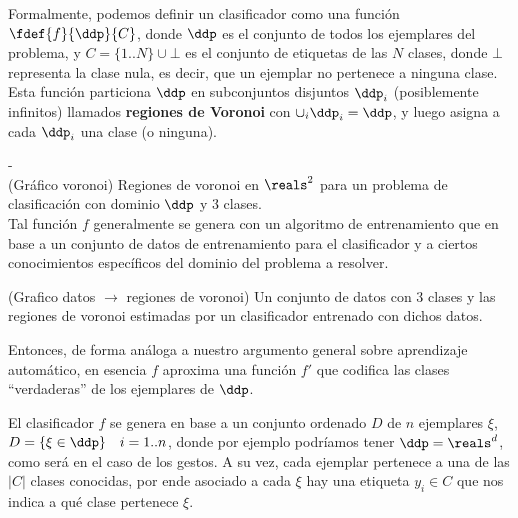 
Formalmente, podemos definir un clasificador como una función $\fdef{f}{\ddp}{C}$, donde $\ddp$ es el conjunto de todos los ejemplares del problema, y $C=\{1..N\} \cup \bot $ es el conjunto de etiquetas de las $N$ clases, donde $\bot$ representa la clase nula, es decir, que un ejemplar no pertenece a ninguna clase. Esta función particiona $\ddp$ en subconjuntos disjuntos $\ddp_i$ (posiblemente infinitos) llamados \textbf{regiones de Voronoi} con $\cup_{i} \ddp_i = \ddp$, y luego asigna a cada $\ddp_i$ una clase (o ninguna). 

-\\(Gráfico voronoi)
Regiones de voronoi en $\reals^2$ para un problema de clasificación con dominio $\ddp$ y 3 clases.\\

Tal función $f$ generalmente se genera con un algoritmo de entrenamiento que en base a un conjunto de datos de entrenamiento para el clasificador y a ciertos conocimientos específicos del dominio del problema a resolver.

(Grafico datos $\rightarrow$ regiones de voronoi)
Un conjunto de datos con 3 clases y las regiones de voronoi estimadas por un clasificador entrenado con dichos datos.

Entonces, de forma análoga a nuestro argumento general sobre aprendizaje automático, en esencia $f$ aproxima una función $f'$ que codifica las clases ``verdaderas'' de los ejemplares de $\ddp$.

El clasificador $f$ se genera en base a un conjunto ordenado $D$ de $n$ ejemplares $\xi$,  $D= \{ \xi \in \ddp \} \quad i=1..n$, donde por ejemplo podríamos tener $\ddp=\reals^d$, como será en el caso de los gestos. A su vez, cada ejemplar pertenece a una de las $|C|$ clases conocidas, por ende asociado a cada $\xi$ hay una etiqueta $y_i \in C$ que nos indica a qué clase pertenece $\xi$. 	